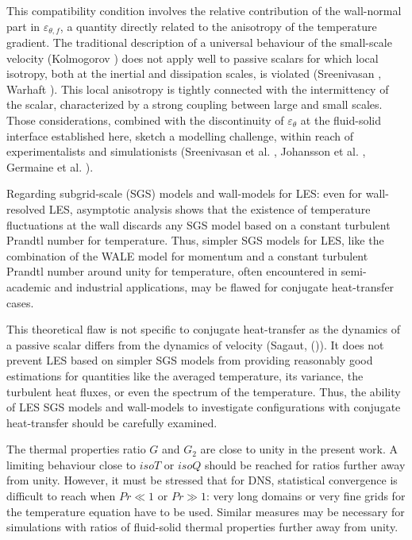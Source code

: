 \documentclass[review]{elsarticle}
\begin{document}
{\color{red} This compatibility condition involves the relative contribution of the wall-normal part in $\varepsilon_{\theta,f}$, a quantity directly related to the anisotropy of the temperature gradient.
The traditional description of a universal behaviour of the small-scale velocity (Kolmogorov \cite{kolmogorov1941local}) does not apply well to passive scalars for which local isotropy, both at the inertial and dissipation scales, is violated (Sreenivasan \cite{sreenivasan1991local}, Warhaft \cite{warhaft2000passive}).
This local anisotropy is tightly connected with the intermittency of the scalar, characterized by a strong coupling between large and small scales.
Those considerations, combined with the discontinuity of $\varepsilon_\theta$ at the fluid-solid interface established here, sketch a modelling challenge, within reach of experimentalists and simulationists (Sreenivasan et al. \citep{sreenivasan1977temperature}, Johansson et al. \cite{johansson2000dns}, Germaine et al. \cite{germaine2014evolution}).

Regarding subgrid-scale (SGS) models and wall-models for LES: even for wall-resolved LES, asymptotic analysis shows that the existence of temperature fluctuations at the wall discards any SGS model based on a constant turbulent Prandtl number for temperature.
Thus, simpler SGS models for LES, like the combination of the WALE model for momentum and a constant turbulent Prandtl number around unity for temperature, often encountered in semi-academic and industrial applications, may be flawed for conjugate heat-transfer cases.

This theoretical flaw is not specific to conjugate heat-transfer as the dynamics of a passive scalar differs from the dynamics of velocity (Sagaut, (\cite{sagaut2006large})).
It does not prevent LES based on simpler SGS models from providing reasonably good estimations for quantities like the averaged temperature, its variance, the turbulent heat fluxes, or even the spectrum of the temperature.
Thus, the ability of LES SGS models and wall-models to investigate configurations with conjugate heat-transfer should be carefully examined.}

The thermal properties ratio $G$ and $G_2$ are close to unity in the present work.
A limiting behaviour close to $isoT$ or $isoQ$ should be reached for ratios further away from unity.
However, it must be stressed that for DNS, statistical convergence is difficult to reach when $Pr \ll 1$ or $Pr \gg 1$: very long domains or very fine grids for the temperature equation have to be used.
Similar measures may be necessary for simulations with ratios of fluid-solid thermal properties further away from unity.
\end{document}
